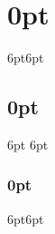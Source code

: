 \documentclass[openany,svgnames]{book}
\begin{document}
\enlargethispage{1.5\baselineskip}
\titleformat{\chapter}[display] {\normalfont\huge\bfseries}{\chaptertitlename\ \thechapter}{20pt}{\Huge}   
\titlespacing*{\chapter}{0pt}{10pt}{10pt}
\titlespacing\section{0pt}{6pt}{6pt}
\titlespacing\subsection{0pt}{6pt }{6pt}
\titlespacing\subsubsection{0pt}{6pt}{6pt}
%
\begin{comment}
\tableofcontents
 


 
\end{comment}

\begin{comment}
























\addtocontents{toc}{\protect\renewcommand{\protect\cftchappresnum}{Appendix }}

\appendix



\end{comment}
\end{document}
